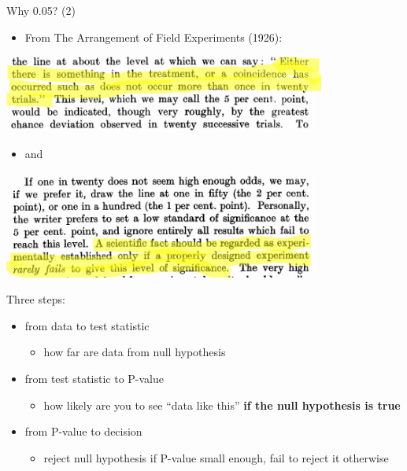 \documentclass[
  ignorenonframetext,
]{beamer}
\providecommand{\tightlist}{%
  \setlength{\itemsep}{0pt}\setlength{\parskip}{0pt}}
\begin{document}
\begin{frame}{Why 0.05? (2)}
\protect\hypertarget{why-0.05-2}{}

\begin{itemize}
\tightlist
\item
  From The Arrangement of Field Experiments (1926):
\end{itemize}

\includegraphics[width=4.16667in,height=\textheight]{fisher1.png}

\begin{itemize}
\tightlist
\item
  and
\end{itemize}

\includegraphics[width=4.16667in,height=\textheight]{fisher2.png}

\end{frame}

\begin{frame}{Three steps:}
\protect\hypertarget{three-steps}{}

\begin{itemize}
\tightlist
\item
  from data to test statistic

  \begin{itemize}
  \tightlist
  \item
    how far are data from null hypothesis
  \end{itemize}
\item
  from test statistic to P-value

  \begin{itemize}
  \tightlist
  \item
    how likely are you to see ``data like this'' \textbf{if the null
    hypothesis is true}
  \end{itemize}
\item
  from P-value to decision

  \begin{itemize}
  \tightlist
  \item
    reject null hypothesis if P-value small enough, fail to reject it
    otherwise
  \end{itemize}
\end{itemize}

\end{frame}
\end{document}
